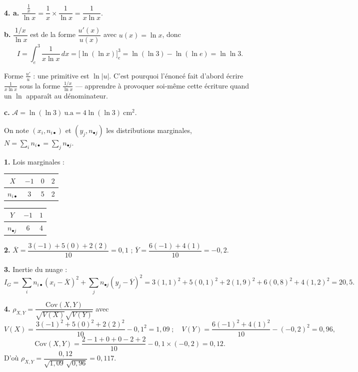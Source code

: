 \documentclass[11pt]{article}
\begin{document}
\textbf{4. a.} $\dfrac{\frac{1}{x}}{\ln x} = \dfrac{1}{x}\times\dfrac{1}{\ln x} = \dfrac{1}{x\ln x}$.

\textbf{b.} $\dfrac{1/x}{\ln x}$ est de la forme $\dfrac{u'(x)}{u(x)}$ avec $u(x) = \ln x$, donc
\[ I = \int_e^3 \frac{1}{x\ln x}\,dx = \big[\ln(\ln x)\big]_e^3 = \ln(\ln 3) - \ln(\ln e) = \ln\ln 3. \]

\begin{rappel}
Forme $\frac{u'}{u}$ : une primitive est $\ln|u|$. C'est pourquoi
l'énoncé fait d'abord écrire $\frac{1}{x\ln x}$ sous la forme
$\frac{1/x}{\ln x}$ — apprendre à provoquer soi-même cette écriture
quand un $\ln$ apparaît au dénominateur.
\end{rappel}

\textbf{c.} $\mathcal{A} = \ln(\ln 3)\ \text{u.a} = 4\ln(\ln 3)\ \text{cm}^2$.

On note $(x_i, n_{i\bullet})$ et $(y_j, n_{\bullet j})$ les distributions marginales, $N = \sum_i n_{i\bullet} = \sum_j n_{\bullet j}$.

\textbf{1.} Lois marginales :
\begin{center}\renewcommand{\arraystretch}{1.3}
\begin{tabular}{|c|c|c|c|}\hline $X$ & $-1$ & $0$ & $2$ \\\hline $n_{i\bullet}$ & 3 & 5 & 2 \\\hline\end{tabular}\qquad
\begin{tabular}{|c|c|c|}\hline $Y$ & $-1$ & $1$ \\\hline $n_{\bullet j}$ & 6 & 4 \\\hline\end{tabular}
\end{center}

\textbf{2.} $\overline{X} = \dfrac{3(-1) + 5(0) + 2(2)}{10} = 0{,}1$ ; \quad $\overline{Y} = \dfrac{6(-1) + 4(1)}{10} = -0{,}2$.

\textbf{3.} Inertie du nuage :
\[ I_G = \sum_i n_{i\bullet}(x_i - \overline{X})^2 + \sum_j n_{\bullet j}(y_j - \overline{Y})^2 = 3(1{,}1)^2 + 5(0{,}1)^2 + 2(1{,}9)^2 + 6(0{,}8)^2 + 4(1{,}2)^2 = 20{,}5. \]

\textbf{4.} $\rho_{X,Y} = \dfrac{\mathrm{Cov}(X,Y)}{\sqrt{V(X)}\sqrt{V(Y)}}$ avec
\[ V(X) = \frac{3(-1)^2 + 5(0)^2 + 2(2)^2}{10} - 0{,}1^2 = 1{,}09 \;;\quad V(Y) = \frac{6(-1)^2 + 4(1)^2}{10} - (-0{,}2)^2 = 0{,}96, \]
\[ \mathrm{Cov}(X,Y) = \frac{2 - 1 + 0 + 0 - 2 + 2}{10} - 0{,}1\times(-0{,}2) = 0{,}12. \]
D'où $\rho_{X,Y} = \dfrac{0{,}12}{\sqrt{1{,}09}\,\sqrt{0{,}96}} = 0{,}117$.
\end{document}
